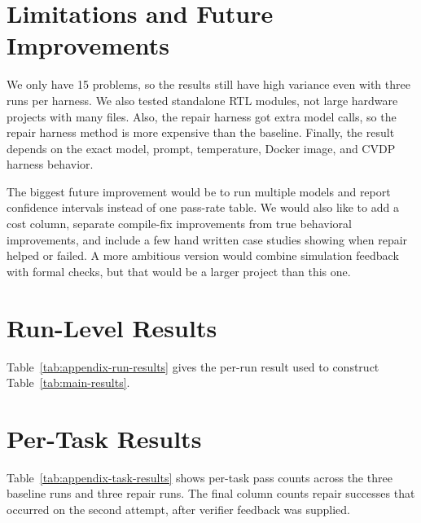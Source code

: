 \documentclass{article}
\begin{document}
\section{Limitations and Future Improvements}

We only have 15 problems, so the results still have high variance even with three runs per harness. We also tested standalone RTL modules, not large hardware projects with many files. Also, the repair harness got extra model calls, so the repair harness method is more expensive than the baseline. Finally, the result depends on the exact model, prompt, temperature, Docker image, and CVDP harness behavior.

The biggest future improvement would be to run multiple models and report confidence intervals instead of one pass-rate table. We would also like to add a cost column, separate compile-fix improvements from true behavioral improvements, and include a few hand written case studies showing when repair helped or failed. A more ambitious version would combine simulation feedback with formal checks, but that would be a larger project than this one.

\appendix

\section{Run-Level Results}

Table~\ref{tab:appendix-run-results} gives the per-run result used to construct Table~\ref{tab:main-results}. 

\begin{table}[h]
\centering
\scriptsize
\resizebox{\linewidth}{!}{}
\caption{Per-run result summary.}
\label{tab:appendix-run-results}
\end{table}

\section{Per-Task Results}

Table~\ref{tab:appendix-task-results} shows per-task pass counts across the three baseline runs and three repair runs. The final column counts repair successes that occurred on the second attempt, after verifier feedback was supplied.

\begin{table}[h]
\centering
\scriptsize
\resizebox{\linewidth}{!}{}
\caption{Per-task result summary across repeated runs.}
\label{tab:appendix-task-results}
\end{table}



\end{document}
